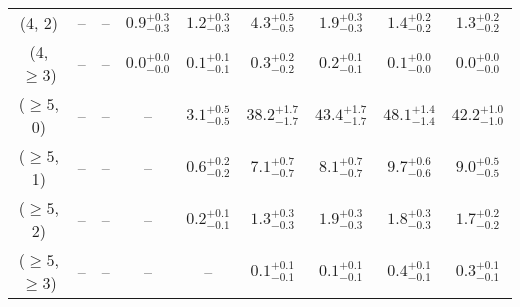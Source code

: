 \begin{table}[h!]
{\begin{tabular}{ccccccccc}
	(4, 2) & -- & -- & $0.9^{+ 0.3 }_{- 0.3 }$ & $1.2^{+ 0.3 }_{- 0.3 }$ & $4.3^{+ 0.5 }_{- 0.5 }$ & $1.9^{+ 0.3 }_{- 0.3 }$ & $1.4^{+ 0.2 }_{- 0.2 }$ & $1.3^{+ 0.2 }_{- 0.2 }$ \\[0.5ex] 
	(4, $\ge3$) & -- & -- & $0.0^{+ 0.0 }_{- 0.0 }$ & $0.1^{+ 0.1 }_{- 0.1 }$ & $0.3^{+ 0.2 }_{- 0.2 }$ & $0.2^{+ 0.1 }_{- 0.1 }$ & $0.1^{+ 0.0 }_{- 0.0 }$ & $0.0^{+ 0.0 }_{- 0.0 }$ \\[0.5ex] 
	($\ge5$, 0) & -- & -- & -- & $3.1^{+ 0.5 }_{- 0.5 }$ & $38.2^{+ 1.7 }_{- 1.7 }$ & $43.4^{+ 1.7 }_{- 1.7 }$ & $48.1^{+ 1.4 }_{- 1.4 }$ & $42.2^{+ 1.0 }_{- 1.0 }$ \\[0.5ex] 
	($\ge5$, 1) & -- & -- & -- & $0.6^{+ 0.2 }_{- 0.2 }$ & $7.1^{+ 0.7 }_{- 0.7 }$ & $8.1^{+ 0.7 }_{- 0.7 }$ & $9.7^{+ 0.6 }_{- 0.6 }$ & $9.0^{+ 0.5 }_{- 0.5 }$ \\[0.5ex] 
	($\ge5$, 2) & -- & -- & -- & $0.2^{+ 0.1 }_{- 0.1 }$ & $1.3^{+ 0.3 }_{- 0.3 }$ & $1.9^{+ 0.3 }_{- 0.3 }$ & $1.8^{+ 0.3 }_{- 0.3 }$ & $1.7^{+ 0.2 }_{- 0.2 }$ \\[0.5ex] 
	($\ge5$, $\ge3$) & -- & -- & -- & -- & $0.1^{+ 0.1 }_{- 0.1 }$ & $0.1^{+ 0.1 }_{- 0.1 }$ & $0.4^{+ 0.1 }_{- 0.1 }$ & $0.3^{+ 0.1 }_{- 0.1 }$ \\[0.5ex] 
	\hline
	\hline
\end{tabular}}
\end{table}
